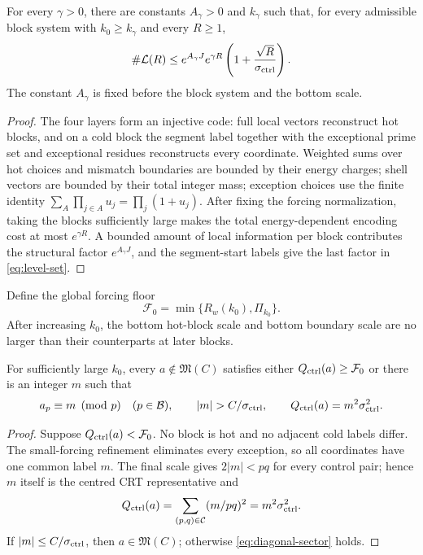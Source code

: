 \begin{proposition}\label{prop:level-set}
For every $\gamma>0$, there are constants $A_\gamma>0$ and
$k_\gamma$ such that, for every admissible block system with
$k_0\ge k_\gamma$ and every $R\ge1$,
\begin{equation}\label{eq:level-set}
 \#\mathcal L(R)
 \le e^{A_\gamma J}e^{\gamma R}
 \left(1+\frac{\sqrt R}{\sigma_{\mathrm{ctrl}}}\right).
\end{equation}
The constant $A_\gamma$ is fixed before the block system and the bottom scale.
\end{proposition}
\begin{proof}
The four layers form an injective code: full local vectors reconstruct hot
blocks, and on a cold block the segment label together with the exceptional
prime set and exceptional residues reconstructs every coordinate.  Weighted
sums over hot choices and mismatch boundaries are bounded by their energy
charges; shell vectors are bounded by their total integer mass; exception
choices use the finite identity $\sum_A\prod_{j\in A}u_j=\prod_j(1+u_j)$.
After fixing the forcing normalization, taking the blocks sufficiently large
makes the total energy-dependent encoding cost at most $e^{\gamma R}$.  A
bounded amount of local information per block contributes the structural
factor $e^{A_\gamma J}$, and the segment-start labels give the last factor in
\eqref{eq:level-set}.
\end{proof}

Define the global forcing floor
\begin{equation}\label{eq:global-floor}
 \mathcal F_0=\min\{R_w(k_0),\Pi_{k_0}\}.
\end{equation}
After increasing $k_0$, the bottom hot-block scale and bottom boundary scale
are no larger than their counterparts at later blocks.

\begin{lemma}[Localization]\label{lem:localization}
For sufficiently large $k_0$, every $a\notin\mathfrak M(C)$ satisfies either
$Q_{\mathrm{ctrl}}(a)\ge\mathcal F_0$ or there is an integer $m$ such that
\begin{equation}\label{eq:diagonal-sector}
 a_p\equiv m\pmod p\quad(p\in\Bset),
 \qquad |m|>C/\sctrl,
 \qquad \Qctrl(a)=m^2\sctrl^2.
\end{equation}
\end{lemma}
\begin{proof}
Suppose $Q_{\mathrm{ctrl}}(a)<\mathcal F_0$.  No block is hot and no adjacent cold labels
differ.  The small-forcing refinement eliminates every exception, so all
coordinates have one common label $m$.  The final scale gives $2|m|<pq$ for
every control pair; hence $m$ itself is the centred CRT representative and
\[
 Q_{\mathrm{ctrl}}(a)=\sum_{(p,q)\in\mathcal C}(m/pq)^2=m^2\sigma_{\mathrm{ctrl}}^2.
\]
If $|m|\le C/\sigma_{\mathrm{ctrl}}$, then $a\in\mathfrak M(C)$; otherwise
\eqref{eq:diagonal-sector} holds.
\end{proof}

